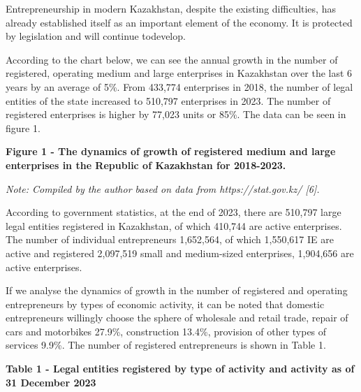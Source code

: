 Entrepreneurship in modern Kazakhstan, despite the existing
difficulties, has already established itself as an important element of
the economy. It is protected by legislation and will continue todevelop.

According to the chart below, we can see the annual growth in the number
of registered, operating medium and large enterprises in Kazakhstan over
the last 6 years by an average of 5\%. From 433,774 enterprises in 2018,
the number of legal entities of the state increased to 510,797
enterprises in 2023. The number of registered enterprises is higher by
77,023 units or 85\%. The data can be seen in figure 1.

{\bfseries Figure 1 - The dynamics of growth of registered medium and large
enterprises in the Republic of Kazakhstan for 2018-2023.}

\emph{Note: Compiled by the author based on data from
https://stat.gov.kz/ {[}6{]}.}

According to government statistics, at the end of 2023, there are
510,797 large legal entities registered in Kazakhstan, of which 410,744
are active enterprises. The number of individual entrepreneurs
1,652,564, of which 1,550,617 IE are active and registered 2,097,519
small and medium-sized enterprises, 1,904,656 are active enterprises.

If we analyse the dynamics of growth in the number of registered and
operating entrepreneurs by types of economic activity, it can be noted
that domestic entrepreneurs willingly choose the sphere of wholesale and
retail trade, repair of cars and motorbikes 27.9\%, construction 13.4\%,
provision of other types of services 9.9\%. The number of registered
entrepreneurs is shown in Table 1.

{\bfseries Table 1 - Legal entities registered by type of activity and
activity as of 31 December 2023}

